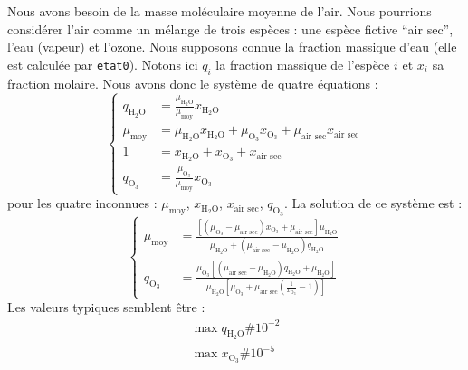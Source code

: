 \documentclass[a4paper,english,french]{article}
\begin{document}
Nous avons besoin de la masse moléculaire moyenne de l'air. Nous
pourrions considérer l'air comme un mélange de trois espèces : une
espèce fictive ``air sec'', l'eau (vapeur) et l'ozone. Nous supposons
connue la fraction massique d'eau (elle est calculée par
\verb+etat0+). Notons ici $q_i$ la fraction massique de l'espèce $i$
et $x_i$ sa fraction molaire. Nous avons donc le système de quatre
équations :
\begin{displaymath}
  \left\{
    \begin{array}{ll}
      q_{\mathrm{H}_2\mathrm{O}}
      & = \frac{\mu_{\mathrm{H}_2\mathrm{O}}}{\mu_\mathrm{moy}}
      x_{\mathrm{H}_2\mathrm{O}} \\
      \mu_\mathrm{moy}
      & = \mu_{\mathrm{H}_2\mathrm{O}} x_{\mathrm{H}_2\mathrm{O}}
      + \mu_{\mathrm{O}_3} x_{\mathrm{O}_3}
      + \mu_\textrm{air sec} x_\textrm{air sec} \\
      1 & = x_{\mathrm{H}_2\mathrm{O}} + x_{\mathrm{O}_3}
      + x_\textrm{air sec} \\
      q_{\mathrm{O}_3} & = \frac{\mu_{\mathrm{O}_3}}{\mu_\mathrm{moy}}
      x_{\mathrm{O}_3}
    \end{array}
  \right.
\end{displaymath}
pour les quatre inconnues : $\mu_\mathrm{moy}$,
$x_{\mathrm{H}_2\mathrm{O}}$, $x_\textrm{air sec}$, $q_{\mathrm{O}_3}$. La
solution de ce système est :
\begin{equation}
  \label{eq:qO3}
  \left\{
    \begin{array}{ll}
      \mu_\mathrm{moy}
      & =
      \frac{[(\mu_{\mathrm{O}_3} - \mu_\textrm{air sec}) x_{\mathrm{O}_3}
        + \mu_\textrm{air sec}] \mu_{\mathrm{H}_2\mathrm{O}}}
      {\mu_{\mathrm{H}_2\mathrm{O}}
        + (\mu_\textrm{air sec} - \mu_{\mathrm{H}_2\mathrm{O}})
        q_{\mathrm{H}_2\mathrm{O}}} \\
      q_{\mathrm{O}_3}
      & =
      \frac{\mu_{\mathrm{O}_3}
        [(\mu_\textrm{air sec} - \mu_{\mathrm{H}_2\mathrm{O}})
        q_{\mathrm{H}_2\mathrm{O}}
        + \mu_{\mathrm{H}_2\mathrm{O}}]}
      {\mu_{\mathrm{H}_2\mathrm{O}}
        \left[
          \mu_{\mathrm{O}_3}
          + \mu_\textrm{air sec}
          \left(
            \frac{1}{x_{\mathrm{O}_3}} - 1
          \right)
        \right]}
    \end{array}
  \right.
\end{equation}
Les valeurs typiques semblent être :
\begin{align*}
  \max q_{\mathrm{H}_2\mathrm{O}} \# 10^{-2} \\
  \max x_{\mathrm{O}_3} \# 10^{-5}
\end{align*}
\end{document}
